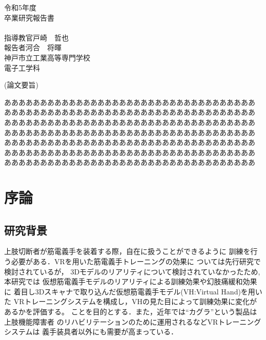 \documentclass{ltjsreport}
\begin{document}
\begin{titlepage}
\begin{center}
\huge 令和5年度\\
\vspace{30pt}
\huge 卒業研究報告書\\
\vspace{50pt}
\HUGE{}\\
\vspace{200pt}
\huge 指導教官\hspace{10pt}戸崎　哲也\\
\huge 報告者\hspace{28pt}河合　将暉\\
\vspace{50pt}
\huge 神戸市立工業高等専門学校\\
\huge 電子工学科
\end{center}
\end{titlepage}
\restoregeometry
\clearpage

\begin{center}
\LARGE (論文要旨)
\end{center}
あああああああああああああああああああああああああああああああああああ
あああああああああああああああああああああああああああああああああああ
あああああああああああああああああああああああああああああああああああ
あああああああああああああああああああああああああああああああああああ
あああああああああああああああああああああああああああああああああああ
あああああああああああああああああああああああああああああああああああ
あああああああああああああああああああああああああああああああああああ
\clearpage

\setcounter{tocdepth}{3}
\tableofcontents
\setcounter{page}{1}

\chapter{序論}
	\section{研究背景}
	上肢切断者が筋電義手を装着する際，自在に扱うことができるように
	訓練を行う必要がある．VRを用いた筋電義手トレーニングの効果に
	ついては先行研究\cite{ref:1}\cite{ref:2}で検討されているが，
	3Dモデルのリアリティについて検討されていなかったため, 本研究では
	仮想筋電義手モデルのリアリティによる訓練効果や幻肢痛緩和効果に
	着目し3Dスキャナで取り込んだ仮想筋電義手モデル(VH:Virtual Hand)を用いた
	VRトレーニングシステムを構成し，VHの見た目によって訓練効果に変化があるかを評価する。
	ことを目的とする．また，近年では``カグラ''\cite{ref:6}という製品は上肢機能障害者
	のリハビリテーションのために運用されるなどVRトレーニングシステムは
	義手装具者以外にも需要が高まっている．
\end{document}
